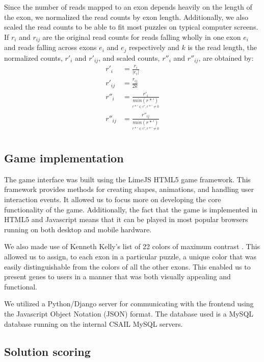 \documentclass[12pt]{article}
\begin{document}
Since the number of reads mapped to an exon depends heavily on the length of the exon, we normalized the read counts by exon length. Additionally, we also scaled the read counts to be able to fit most puzzles on typical computer screens. If $r_i$ and $r_{ij}$ are the original read counts for reads falling wholly in one exon $e_i$ and reads falling across exons $e_i$ and $e_j$ respectively and $k$ is the read length, the normalized counts,  $r'_i$ and $r'_{ij}$, and scaled counts, $r''_i$ and $r''_{ij}$, are obtained by:
\begin{align*}
r'_i &= \frac{r_i}{|e_i|} \\
r'_{ij} &= \frac{r_{ij}}{2k} \\
r''_i &= \frac{r'_i}{\underset{r*' \in r', r*' \not = 0}{min(r*')}} \\
r''_{ij} &= \frac{r''_{ij}}{\underset{r*' \in r', r*' \not = 0}{min(r*')}} \\
\end{align*}

\subsection*{Game implementation}
The game interface was built using the LimeJS HTML5 game framework. This framework provides methods for creating shapes,
animations, and handling user interaction events. It allowed us to focus more on developing the core functionality of the game.
Additionally, the fact that the game is implemented in HTML5 and Javascript means that it can be played in most popular browsers running on both desktop and mobile hardware.

We also made use of Kenneth Kelly's list of 22 colors of maximum contrast \citep{green2010colour}. This allowed us to assign, to each exon in a particular puzzle, a unique color that was easily distinguishable from the colors of all the other exons. This enabled us to present genes to 
users in a manner that was both visually appealing and functional.

We utilized a Python/Django server for communicating with the frontend using the Javascript Object Notation (JSON) format. The database used is a MySQL database running on the internal CSAIL MySQL servers. 

\subsection*{Solution scoring}
\label{sec:scoring}
\end{document}
